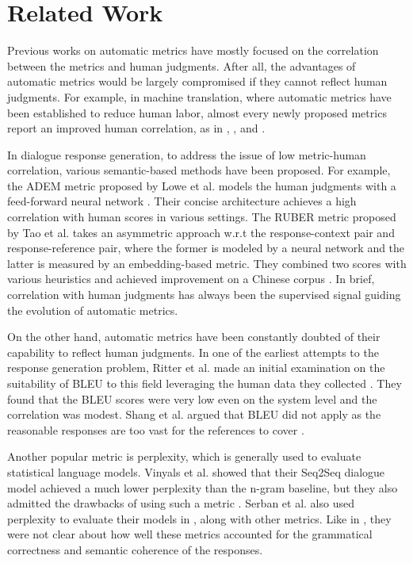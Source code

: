 \documentclass[runningheads]{llncs}
\begin{document}
    \section{Related Work}
    Previous works on automatic metrics have mostly focused on the correlation between the metrics and human judgments. After all, the advantages of automatic metrics would be largely compromised if they cannot reflect human judgments. For example, in machine translation, where automatic metrics have been established to reduce human labor, almost every newly proposed metrics report an improved human correlation, as in \cite{NIST}, \cite{METEOR}, and \cite{chrf}.

    In dialogue response generation, to address the issue of low metric-human correlation, various semantic-based methods have been proposed. For example, the ADEM metric proposed by Lowe et al. models the human judgments with a feed-forward neural network \cite{ADEM}. Their concise architecture achieves a high correlation with human scores in various settings. The RUBER metric proposed by Tao et al. takes an asymmetric approach w.r.t the response-context pair and response-reference pair, where the former is modeled by a neural network and the latter is measured by an embedding-based metric. They combined two scores with various heuristics and achieved improvement on a Chinese corpus \cite{RUBER}. In brief, correlation with human judgments has always been the supervised signal guiding the evolution of automatic metrics.

    On the other hand, automatic metrics have been constantly doubted of their capability to reflect human judgments. In one of the earliest attempts to the response generation problem, Ritter et al. made an initial examination on the suitability of BLEU to this field leveraging the human data they collected \cite{Ritter11}. They found that the BLEU scores were very low even on the system level and the correlation was modest. Shang et al. argued that BLEU did not apply as the reasonable responses are too vast for the references to cover \cite{Shang}.

    Another popular metric is perplexity, which is generally used to evaluate statistical language models. Vinyals et al. showed that their Seq2Seq dialogue model achieved a much lower perplexity than the n-gram baseline, but they also admitted the drawbacks of using such a metric \cite{GoogleChatbot}. Serban et al. also used perplexity to evaluate their models in \cite{HRED}, along with other metrics. Like in \cite{GoogleChatbot}, they were not clear about how well these metrics accounted for the grammatical correctness and semantic coherence of the responses.
\end{document}
